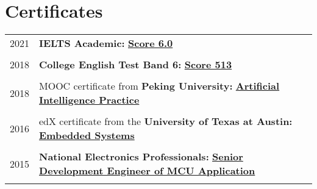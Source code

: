 \documentclass[a4paper,10pt]{article} %
\begin{document}
\section{Certificates}
\begin{tabular}{r|l}	
2021                        & \textbf{IELTS Academic:} \href{https://nbviewer.org/github/HuangJiaLian/DataBase0/blob/cd031badd0d3f5841b182a9bf8b0a2daa9b96f84/uPic/2021_12_04_15_IELTS.pdf}{\textbf{Score 6.0}}\\
\multicolumn{2}{c}{} \\	%

2018                        & \textbf{College English Test Band 6:} \href{https://nbviewer.org/github/HuangJiaLian/DataBase0/blob/fc6547e18e86cdb0584c398827f9f83a50d3c04b/uPic/2021_12_04_15_CET6.pdf}{\textbf{Score 513}}\\
\multicolumn{2}{c}{} \\	%

2018                        & MOOC certificate from \textbf{Peking University:} \href{https://nbviewer.org/github/HuangJiaLian/DataBase0/blob/edd29a7b30885820fabc6720dac9bd56c0cb9851/uPic/2021_11_26_10_Peking_AI.png}{\textbf{Artificial Intelligence Practice}}\\
\multicolumn{2}{c}{} \\	%

2016                        & edX certificate from the \textbf{University of Texas at Austin:} \href{https://nbviewer.org/github/HuangJiaLian/DataBase0/blob/37d6fc3eadd7a5276f030f00b0a618de66df0e78/uPic/2021_11_26_09_UTAustinX_UT.6.03x_Certificate_edX.pdf}{\textbf{Embedded Systems} }\\   	
\multicolumn{2}{c}{} \\	%

2015                     & 
\textbf{National Electronics Professionals:}  \href{https://nbviewer.org/github/HuangJiaLian/DataBase0/blob/f0bbfb6e2f2189b6ae0c43100579b9605faed6a6/uPic/2021_11_26_12_8.png}{\textbf{Senior Development Engineer of MCU Application}}\\
\multicolumn{2}{c}{} \\	%



\end{tabular}
\end{document}
